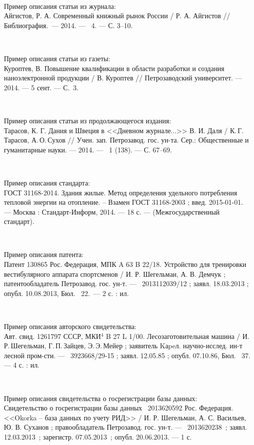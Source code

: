 \documentclass[utf8,14pt, coursreport]{G7-32}
\begin{document}
~

Пример описания статьи из журнала:\\
Айгистов, Р. А. Современный книжный рынок России / Р. А. Айгистов // Библиография.~--- 2014. --- \No~4. --- С. 3--10.

~

Пример описания статьи из газеты:\\
Куроптев, В. Повышение квалификации в области разработки и создания наноэлектронной продукции / В. Куроптев // Петрозаводский университет. --- 2014. --- 5 сент. --- С.~3.

~

Пример описания статьи из продолжающегося издания:\\ 
Тарасов, К. Г. Дания и Швеция в <<Дневном журнале...>> В. И. Даля / К.\,Г.\,Тарасов, А.\,О.\,Сухов // Учен. зап. Петрозавод. гос. ун-та. Сер.: Общественные и гуманитарные науки. --- 2014. --- \No~1 (138). --- С. 67--69. 

~

Пример описания стандарта:\\
ГОСТ 31168-2014. Здания жилые. Метод определения удельного потребления тепловой энергии на отопление. -- Взамен ГОСТ 31168-2003 ; введ. 2015-01-01. --- Москва : Стандарт-Информ, 2014. --- 18 с. --- (Межгосударственный стандарт).

~

Пример описания патента:\\
Патент 130865 Рос. Федерация, МПК A 63 B 22/18. Устройство для тренировки вестибулярного аппарата спортсменов / И. Р. Шегельман, А. В. Демчук ; патентообладатель Петрозавод. гос. ун-т. --- \No~2013112039/12 ; заявл. 18.03.2013 ; опубл. 10.08.2013, Бюл. \No~22.~--- 2 с. : ил. 

~

Пример описания авторского свидетельства:\\
Авт. свид. 1261797 СССР, МКИ$^4$ B 27 L 1/00. Лесозаготовительная машина / И.\,Р.\,Шегель\-ман, Г.\,П.\,Зайцев, Э.\,Э.\,Мейер ; заявитель Kаpeл. научно-исслед. ин-т 
лесной пром-сти. --- \No~3923668/29-15 ; заявл. 12.05.85 ; опубл. 07.10.86, Бюл. \No~37. --- 4 с. : ил. 

~

Пример описания свидетельства о госрегистрации базы данных:\\
Свидетельство о госрегистрации базы данных \No~2013620592 Рос. Федерация.
<<Okorka -- база данных по учету РИД>> / И. Р. Шегельман, А. С. Васильев, Ю. В. Суханов ; правообладатель Петрозавод. гос. ун-т. --- \No~2013620238~; заявл. 12.03.2013~; зарегистр. 07.05.2013~; опубл. 20.06.2013. --- 1 с. 
\end{document}
